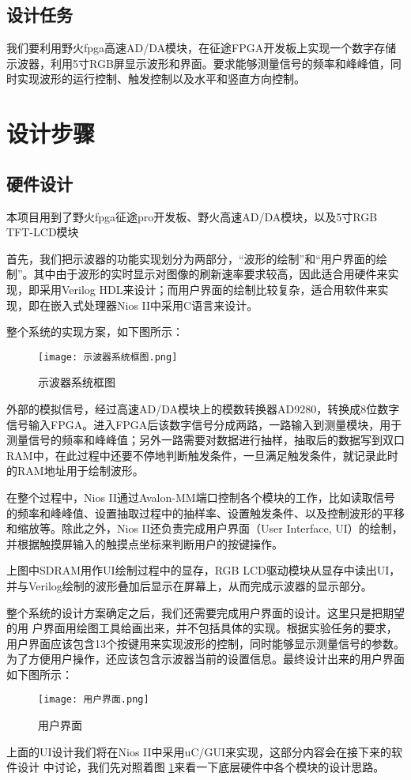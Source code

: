 \documentclass[lang=cn,a4paper,newtx]{elegantpaper}
\begin{document}
\subsection{设计任务}
我们要利用野火fpga高速AD/DA模块，在征途FPGA开发板上实现一个数字存储示波器，利用5寸RGB屏显示波形和界面。要求能够测量信号的频率和峰峰值，同时实现波形的运行控制、触发控制以及水平和竖直方向控制。

\section{设计步骤}
\subsection{硬件设计}
本项目用到了野火fpga征途pro开发板、野火高速AD/DA模块，以及5寸RGB TFT-LCD模块

首先，我们把示波器的功能实现划分为两部分，“波形的绘制”和“用户界面的绘制”。其中由于波形的实时显示对图像的刷新速率要求较高，因此适合用硬件来实现，即采用Verilog HDL来设计；而用户界面的绘制比较复杂，适合用软件来实现，即在嵌入式处理器Nios II中采用C语言来设计。

整个系统的实现方案，如下图所示：
  \begin{figure}[!htb]
	\centering
	\caption{示波器系统框图}
	\label{示波器系统框图}
	\texttt{[image: 示波器系统框图.png]}
\end{figure}

外部的模拟信号，经过高速AD/DA模块上的模数转换器AD9280，转换成8位数字信号输入FPGA。进入FPGA后该数字信号分成两路，一路输入到测量模块，用于测量信号的频率和峰峰值；另外一路需要对数据进行抽样，抽取后的数据写到双口RAM中，在此过程中还要不停地判断触发条件，一旦满足触发条件，就记录此时的RAM地址用于绘制波形。

在整个过程中，Nios II通过Avalon-MM端口控制各个模块的工作，比如读取信号的频率和峰峰值、设置抽取过程中的抽样率、设置触发条件、以及控制波形的平移和缩放等。除此之外，Nios II还负责完成用户界面（User Interface, UI）的绘制，并根据触摸屏输入的触摸点坐标来判断用户的按键操作。

上图中SDRAM用作UI绘制过程中的显存，RGB LCD驱动模块从显存中读出UI，并与Verilog绘制的波形叠加后显示在屏幕上，从而完成示波器的显示部分。

整个系统的设计方案确定之后，我们还需要完成用户界面的设计。这里只是把期望的用
户界面用绘图工具给画出来，并不包括具体的实现。根据实验任务的要求，用户界面应该包含13个按键用来实现波形的控制，同时能够显示测量信号的参数。为了方便用户操作，还应该包含示波器当前的设置信息。最终设计出来的用户界面如下图所示： 
  \begin{figure}[!htb]
	\centering
	\caption{用户界面}
	\label{用户界面}
	\texttt{[image: 用户界面.png]}
\end{figure}
上面的UI设计我们将在Nios II中采用uC/GUI来实现，这部分内容会在接下来的软件设计
中讨论，我们先对照着图 \ref{示波器系统框图}来看一下底层硬件中各个模块的设计思路。
\end{document}
